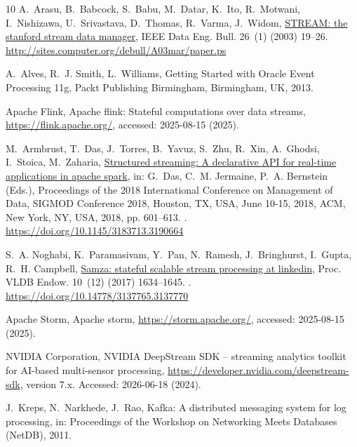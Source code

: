 \documentclass[5p,times]{elsarticle}
\begin{document}
\begin{thebibliography}{10}
A.~Arasu, B.~Babcock, S.~Babu, M.~Datar, K.~Ito, R.~Motwani, I.~Nishizawa, U.~Srivastava, D.~Thomas, R.~Varma, J.~Widom, \href{http://sites.computer.org/debull/A03mar/paper.ps}{{STREAM:} the stanford stream data manager}, {IEEE} Data Eng. Bull. 26~(1) (2003) 19--26.
\newline\urlprefix\url{http://sites.computer.org/debull/A03mar/paper.ps}

A.~Alves, R.~J. Smith, L.~Williams, Getting Started with Oracle Event Processing 11g, Packt Publishing Birmingham, Birmingham, UK, 2013.

{Apache Flink}, Apache flink: Stateful computations over data streams, \url{https://flink.apache.org/}, accessed: 2025-08-15 (2025).

M.~Armbrust, T.~Das, J.~Torres, B.~Yavuz, S.~Zhu, R.~Xin, A.~Ghodsi, I.~Stoica, M.~Zaharia, \href{https://doi.org/10.1145/3183713.3190664}{Structured streaming: {A} declarative {API} for real-time applications in apache spark}, in: G.~Das, C.~M. Jermaine, P.~A. Bernstein (Eds.), Proceedings of the 2018 International Conference on Management of Data, {SIGMOD} Conference 2018, Houston, TX, USA, June 10-15, 2018, {ACM}, New York, NY, USA, 2018, pp. 601--613.
\newblock \href {http://dx.doi.org/10.1145/3183713.3190664} {}.
\newline\urlprefix\url{https://doi.org/10.1145/3183713.3190664}

S.~A. Noghabi, K.~Paramasivam, Y.~Pan, N.~Ramesh, J.~Bringhurst, I.~Gupta, R.~H. Campbell, \href{https://doi.org/10.14778/3137765.3137770}{Samza: stateful scalable stream processing at linkedin}, Proc. VLDB Endow. 10~(12) (2017) 1634–1645.
\newblock \href {http://dx.doi.org/10.14778/3137765.3137770} {}.
\newline\urlprefix\url{https://doi.org/10.14778/3137765.3137770}

{Apache Storm}, Apache storm, \url{https://storm.apache.org/}, accessed: 2025-08-15 (2025).

{NVIDIA Corporation}, {NVIDIA DeepStream SDK} -- streaming analytics toolkit for {AI}-based multi-sensor processing, \url{https://developer.nvidia.com/deepstream-sdk}, version 7.x. Accessed: 2026-06-18 (2024).

J.~Kreps, N.~Narkhede, J.~Rao, {Kafka}: A distributed messaging system for log processing, in: Proceedings of the Workshop on Networking Meets Databases (NetDB), 2011.


\end{thebibliography}
\end{document}

